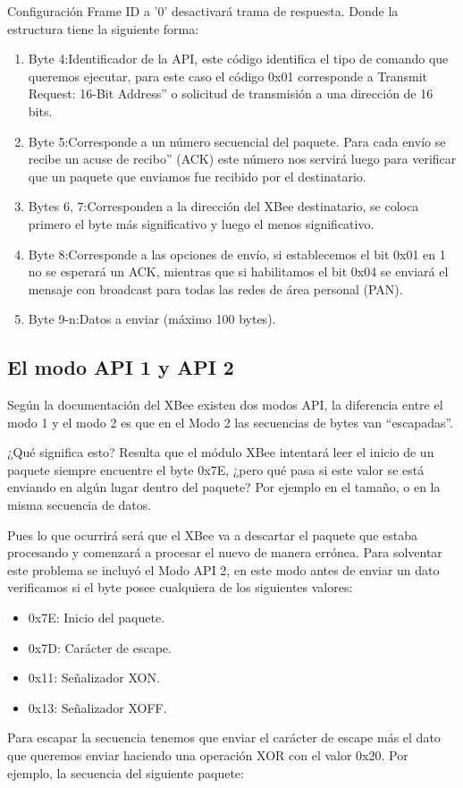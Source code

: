 \documentclass[11pt,oneside,spanish,a4paper]{article}
\begin{document}
Configuración Frame ID a '0' desactivará trama de respuesta.
Donde la estructura tiene la siguiente forma:
\begin{enumerate}
	\item Byte 4:Identificador de la API, este código identifica el
      tipo de comando que queremos ejecutar, para este caso el código
      0x01 corresponde a Transmit Request: 16-Bit Address'' o solicitud de transmisión a una dirección de 16 bits.
	\item Byte 5:Corresponde a un número secuencial del paquete. Para cada envío se recibe un acuse de recibo'' (ACK) este número nos servirá luego para verificar que un paquete que enviamos fue recibido por el destinatario.
	\item Bytes 6, 7:Corresponden a la dirección del XBee destinatario, se coloca primero el byte más significativo y luego el menos significativo.
	\item Byte 8:Corresponde a las opciones de envío, si establecemos el bit 0x01 en 1 no se esperará un ACK, mientras que si habilitamos el bit 0x04 se enviará el mensaje con broadcast para todas las redes de área personal (PAN).
	\item Byte 9-n:Datos a enviar (máximo 100 bytes).
\end{enumerate}
\subsection{El modo API 1 y API 2}
Según la documentación del XBee existen dos modos API, la diferencia entre el modo 1 y el modo 2 es que en el Modo 2 las secuencias de bytes van ``escapadas''.

¿Qué significa esto? Resulta que el módulo XBee intentará leer el inicio de un paquete siempre encuentre el byte 0x7E, ¿pero qué pasa si este valor se está enviando en algún lugar dentro del paquete? Por ejemplo en el tamaño, o en la misma secuencia de datos.

Pues lo que ocurrirá será que el XBee va a descartar el paquete que estaba procesando y comenzará a procesar el nuevo de manera errónea. Para solventar este problema se incluyó el Modo API 2, en este modo antes de enviar un dato verificamos si el byte posee cualquiera de los siguientes valores:
\begin{itemize}
	\item 0x7E: Inicio del paquete.
	\item 0x7D: Carácter de escape.
	\item 0x11: Señalizador XON.
	\item 0x13: Señalizador XOFF.	
\end{itemize}
Para escapar la secuencia tenemos que enviar el carácter de escape más el dato que queremos enviar haciendo una operación XOR con el valor 0x20.
Por ejemplo, la secuencia del siguiente paquete:
\end{document}

